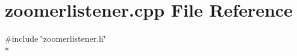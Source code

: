 \section{zoomerlistener.\+cpp File Reference}
\label{zoomerlistener_8cpp}
{\ttfamily \#include \char`\"{}zoomerlistener.\+h\char`\"{}}\\*
